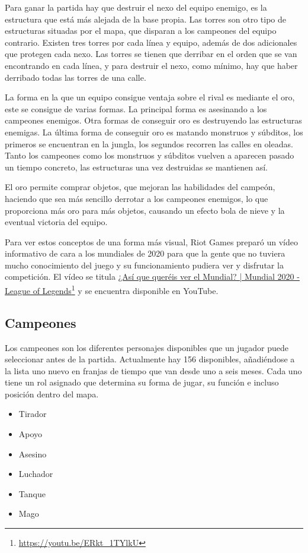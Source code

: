 Para ganar la partida hay que destruir el nexo del equipo enemigo, es la estructura que está más alejada de la base propia. Las torres son otro tipo de estructuras situadas por el mapa, que disparan a los campeones del equipo contrario. Existen tres torres por cada línea y equipo, además de dos adicionales que protegen cada nexo. Las torres se tienen que derribar en el orden que se van encontrando en cada línea, y para destruir el nexo, como mínimo, hay que haber derribado todas las torres de una calle.

La forma en la que un equipo consigue ventaja sobre el rival es mediante el oro, este se consigue de varias formas. La principal forma es asesinando a los campeones enemigos. Otra formas de conseguir oro es destruyendo las estructuras enemigas. La última forma de conseguir oro es matando monstruos y súbditos, los primeros se encuentran en la jungla, los segundos recorren las calles en oleadas. Tanto los campeones como los monstruos y súbditos vuelven a aparecen pasado un tiempo concreto, las estructuras una vez destruidas se mantienen así.

El oro permite comprar objetos, que mejoran las habilidades del campeón, haciendo que sea más sencillo derrotar a los campeones enemigos, lo que proporciona más oro para más objetos, causando un efecto bola de nieve y la eventual victoria del equipo.

Para ver estos conceptos de una forma más visual, Riot Games preparó un vídeo informativo de cara a los mundiales de 2020 para que la gente que no tuviera mucho conocimiento del juego y su funcionamiento pudiera ver y disfrutar la competición. El vídeo se titula \href{https://www.youtube.com/watch?v=ERkt_1TYlkU}{¿Así que queréis ver el Mundial? | Mundial 2020 - League of Legends}\footnote{\url{https://youtu.be/ERkt_1TYlkU}} y se encuentra disponible en YouTube.


\subsection{Campeones}
Los campeones son los diferentes personajes disponibles que un jugador puede seleccionar antes de la partida. Actualmente hay 156 disponibles, añadiéndose a la lista uno nuevo en franjas de tiempo que van desde uno a seis meses. Cada uno tiene un rol asignado que determina su forma de jugar, su función e incluso posición dentro del mapa.
\begin{itemize}
	\tightlist
	\item Tirador
	\item Apoyo
	\item Asesino
	\item Luchador
	\item Tanque
	\item Mago
\end{itemize}

